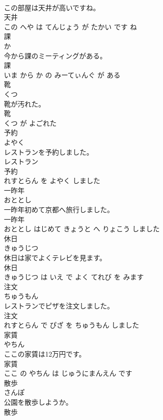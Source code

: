 \documentclass[8pt]{extreport}
\begin{document}
\begin{CJK}{UTF8}{min}
\\	この部屋は天井が高いですね。	
\\	天井 
\\	この へや は てんじょう が たかい です ね			
\\	課	
\\	か			
\\	今から課のミーティングがある。	
\\	課 
\\	いま から か の みーてぃんぐ が ある			
\\	靴	
\\	くつ			
\\	靴が汚れた。	
\\	靴 
\\	くつ が よごれた			
\\	予約	
\\	よやく			
\\	レストランを予約しました。	
\\	レストラン 
\\	予約 
\\	れすとらん を よやく しました			
\\	一昨年	
\\	おととし			
\\	一昨年初めて京都へ旅行しました。	
\\	一昨年 
\\	おととし はじめて きょうと へ りょこう しました			
\\	休日	
\\	きゅうじつ			
\\	休日は家でよくテレビを見ます。	
\\	休日 
\\	きゅうじつ は いえ で よく てれび を みます			
\\	注文	
\\	ちゅうもん			
\\	レストランでピザを注文しました。	
\\	注文 
\\	れすとらん で ぴざ を ちゅうもん しました			
\\	家賃	
\\	やちん			
\\	ここの家賃は12万円です。	
\\	家賃 
\\	ここ の やちん は じゅうにまんえん です			
\\	散歩	
\\	さんぽ			
\\	公園を散歩しようか。	
\\	散歩 

\end{CJK}
\end{document}
